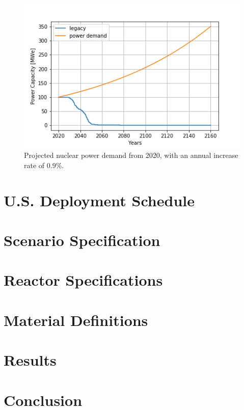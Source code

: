 \begin{figure}[htbp!]
	\begin{center}
		\includegraphics[scale=0.6]{./images/us/projection.png}
	\end{center}
	\caption{Projected nuclear power demand from 2020, with an
			 annual increase rate of 0.9\%.}
	\label{fig:us_proj}
\end{figure}

\section{U.S. Deployment Schedule}

\section{Scenario Specification}

\section{Reactor Specifications}

\section{Material Definitions}

\section{Results}

\section{Conclusion}